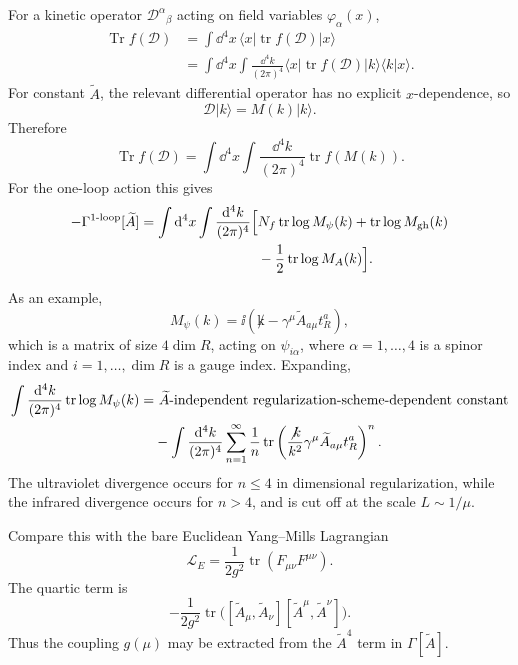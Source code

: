 For a kinetic operator \(\mathcal D^\alpha{}_\beta\) acting on field
variables \(\varphi_\alpha(x)\),
\[
\begin{aligned}
  \operatorname{Tr}f(\mathcal D)
  &=
  \int\dd^4x\,
  \langle x|\operatorname{tr}f(\mathcal D)|x\rangle
\\
  &=
  \int\dd^4x
  \int\frac{\dd^4k}{(2\pi)^4}
  \langle x|\operatorname{tr}f(\mathcal D)|k\rangle
  \langle k|x\rangle .
\end{aligned}
\]
For constant \(\widetilde A\), the relevant differential operator has no
explicit \(x\)-dependence, so
\[
  \mathcal D|k\rangle=M(k)|k\rangle .
\]
Therefore
\[
  \operatorname{Tr}f(\mathcal D)
  =
  \int\dd^4x
  \int\frac{\dd^4k}{(2\pi)^4}
  \operatorname{tr}f(M(k)).
\]
For the one-loop action this gives
\[
\begin{aligned}
  -\Gamma^{\text{1-loop}}[\widetilde A]
  =
  \int\mathrm{d}^4x
  \int\frac{\mathrm{d}^4k}{(2\pi)^4}
  \Bigl[
    &N_f\operatorname{tr}\log M_\psi(k)
    +\operatorname{tr}\log M_{\rm gh}(k)
\\
    &-\frac{1}{2}\operatorname{tr}\log M_A(k)
  \Bigr].
\end{aligned}
\]

As an example,
\[
  M_\psi(k)
  =
  \ii\left(\not k-\gamma^\mu\widetilde A_{a\mu}t_R^a\right),
\]
which is a matrix of size \(4\dim R\), acting on
\(\psi_{i\alpha}\), where \(\alpha=1,\ldots,4\) is a spinor index and
\(i=1,\ldots,\dim R\) is a gauge index.  Expanding,
\[
\begin{aligned}
  \int\frac{\mathrm{d}^4k}{(2\pi)^4}
  \operatorname{tr}\log M_\psi(k)
  =
  &\ \widetilde A\hbox{-independent regularization-scheme-dependent
  constant}
\\
  &-
  \int\frac{\mathrm{d}^4k}{(2\pi)^4}
  \sum_{n=1}^{\infty}
  \frac{1}{n}
  \operatorname{tr}
  \left(
    \frac{\not k}{k^2}
    \gamma^\mu\widetilde A_{a\mu}t_R^a
  \right)^n .
\end{aligned}
\]
The ultraviolet divergence occurs for \(n\le 4\) in dimensional
regularization, while the infrared divergence occurs for \(n>4\), and is
cut off at the scale \(L\sim1/\mu\).

Compare this with the bare Euclidean Yang--Mills Lagrangian
\[
  \mathcal L_E
  =
  \frac{1}{2g^2}\operatorname{tr}(F_{\mu\nu}F^{\mu\nu}).
\]
The quartic term is
\[
  -\frac{1}{2g^2}
  \operatorname{tr}
  \bigl(
    [\widetilde A_\mu,\widetilde A_\nu]
    [\widetilde A^\mu,\widetilde A^\nu]
  \bigr).
\]
Thus the coupling \(g(\mu)\) may be extracted from the
\(\widetilde A^4\) term in \(\Gamma[\widetilde A]\).

